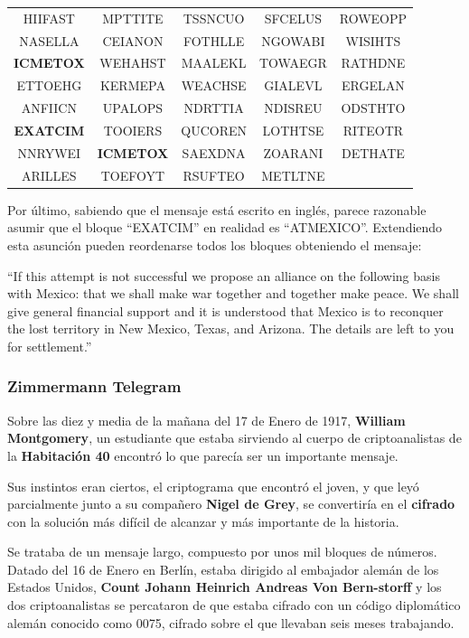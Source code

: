 \documentclass[nochap]{apuntesURJC}
\begin{document}
\begin{center}
\begin{tabular}{ccccc}
HIIFAST & MPTTITE & TSSNCUO & SFCELUS & ROWEOPP\\
NASELLA & CEIANON & FOTHLLE & NGOWABI & WISIHTS\\
\textbf{ICMETOX} & WEHAHST & MAALEKL & TOWAEGR & RATHDNE\\
ETTOEHG & KERMEPA & WEACHSE & GIALEVL & ERGELAN\\
ANFIICN & UPALOPS & NDRTTIA & NDISREU & ODSTHTO\\
\textbf{EXATCIM} & TOOIERS & QUCOREN & LOTHTSE & RITEOTR\\
NNRYWEI & \textbf{ICMETOX} & SAEXDNA & ZOARANI & DETHATE\\
ARILLES & TOEFOYT & RSUFTEO & METLTNE &
\end{tabular}
\end{center}

Por último, sabiendo que el mensaje está escrito en inglés, parece razonable asumir que el bloque ``EXATCIM'' en realidad es ``ATMEXICO''. Extendiendo esta asunción pueden reordenarse todos los bloques obteniendo el mensaje:

\begin{center}
``If this attempt is not successful we propose an alliance on the following basis with Mexico: that we shall make war together and together make peace. We shall give general financial support and it is understood that Mexico is to reconquer the lost territory in New Mexico, Texas, and Arizona. The details are left to you for settlement.''
\end{center}

\subsubsection{Zimmermann Telegram}
Sobre las diez y media de la mañana del 17 de Enero de 1917, \textbf{William Montgomery}, un estudiante que estaba sirviendo al cuerpo de criptoanalistas de la \textbf{Habitación 40} encontró lo que parecía ser un importante mensaje.

Sus instintos eran ciertos, el criptograma que encontró el joven, y que leyó parcialmente junto a su compañero \textbf{Nigel de Grey}, se convertiría en el \textbf{cifrado} con la solución más difícil de alcanzar y más importante de la historia.

Se trataba de un mensaje largo, compuesto por unos mil bloques de números. Datado del 16 de Enero en Berlín, estaba dirigido al embajador alemán de los Estados Unidos, \textbf{Count Johann Heinrich Andreas Von Bern-storff} y los dos criptoanalistas se percataron de que estaba cifrado con un código diplomático alemán conocido como 0075, cifrado sobre el que llevaban seis meses trabajando.
\end{document}
